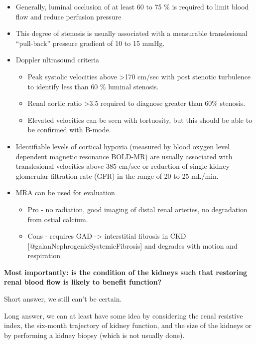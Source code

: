 \documentclass[
]{book}
\begin{document}
\begin{itemize}
\item
  Generally, luminal occlusion of at least 60 to 75 \% is required to
  limit blood flow and reduce perfusion pressure
\item
  This degree of stenosis is usually associated with a measurable
  translesional ``pull-back'' pressure gradient of 10 to 15 mmHg.
\item
  Doppler ultrasound criteria \citep{hoffmannRoleDuplexScanning1991, zierlerStrandnessDuplexScanning2016}

  \begin{itemize}
  \item
    Peak systolic velocities above \textgreater170 cm/sec with post stenotic
    turbulence to identify less than 60 \% luminal stenosis.
  \item
    Renal aortic ratio \textgreater3.5 required to diagnose greater than 60\%
    stenosis.
  \item
    Elevated velocities can be seen with tortuosity, but this should
    be able to be confirmed with B-mode.
  \end{itemize}
\item
  Identifiable levels of cortical hypoxia (measured by blood oxygen
  level dependent magnetic resonance BOLD-MR) are usually associated
  with translesional velocities above 385 cm/sec or reduction of
  single kidney glomerular filtration rate (GFR) in the range of 20 to
  25 mL/min.
\item
  MRA can be used for evaluation

  \begin{itemize}
  \item
    Pro - no radiation, good imaging of distal renal arteries, no
    degradation from ostial calcium.
  \item
    Cons - requires GAD -\textgreater{} interstitial fibrosis in CKD
    {[}@galanNephrogenicSystemicFibrosis{]} and degrades with motion
    and respiration
    \citep{nelsonGadoliniumenhancedBreathholdThreedimensional1999}
  \end{itemize}
\end{itemize}

\textbf{Most importantly: is the condition of the kidneys such that restoring
renal blood flow is likely to benefit function?}

Short answer, we still can't be certain.

Long answer, we can at least have some idea by considering the renal
resistive index, the six-month trajectory of kidney function, and the
size of the kidneys or by performing a kidney biopsy (which is not
usually done).
\end{document}
